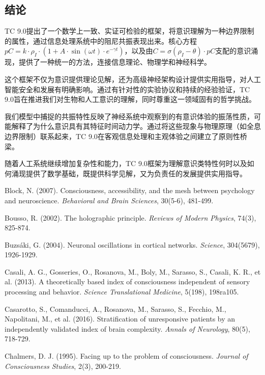\documentclass[12pt]{article}
\begin{document}
\begin{CJK}{UTF8}{gbsn}
\section{结论}
TC 9.0提出了一个数学上一致、实证可检验的框架，将意识理解为一种边界限制的属性，通过信息处理系统中的阻尼共振表现出来。核心方程$pC = k \cdot \rho_I \cdot (1 + A \cdot \sin(\omega t) \cdot e^{-\gamma t})$，以及由$C = \sigma(\rho_I - \theta) \cdot pC$支配的意识涌现，提供了一种统一的方法，连接信息理论、物理学和神经科学。

这个框架不仅为意识提供理论见解，还为高级神经架构设计提供实用指导，对人工智能安全和发展有明确影响。通过有针对性的实验协议和持续的经验验证，TC 9.0旨在推进我们对生物和人工意识的理解，同时尊重这一领域固有的哲学挑战。

我们模型中捕捉的共振特性反映了神经系统中观察到的有意识体验的振荡性质，可能解释了为什么意识具有其特征时间动力学。通过将这些现象与物理原理（如全息边界限制）联系起来，TC 9.0在客观信息处理和主观体验之间建立了原则性桥梁。

随着人工系统继续增加复杂性和能力，TC 9.0框架为理解意识类特性何时以及如何涌现提供了数学基础，既提供科学见解，又为负责任的发展提供实用指导。

\begin{thebibliography}{99}
     Block, N. (2007). Consciousness, accessibility, and the mesh between psychology and neuroscience. \emph{Behavioral and Brain Sciences}, 30(5-6), 481-499.
    
     Bousso, R. (2002). The holographic principle. \emph{Reviews of Modern Physics}, 74(3), 825-874.
    
     Buzsáki, G. (2004). Neuronal oscillations in cortical networks. \emph{Science}, 304(5679), 1926-1929.
    
     Casali, A. G., Gosseries, O., Rosanova, M., Boly, M., Sarasso, S., Casali, K. R., et al. (2013). A theoretically based index of consciousness independent of sensory processing and behavior. \emph{Science Translational Medicine}, 5(198), 198ra105.
    
     Casarotto, S., Comanducci, A., Rosanova, M., Sarasso, S., Fecchio, M., Napolitani, M., et al. (2016). Stratification of unresponsive patients by an independently validated index of brain complexity. \emph{Annals of Neurology}, 80(5), 718-729.
    
     Chalmers, D. J. (1995). Facing up to the problem of consciousness. \emph{Journal of Consciousness Studies}, 2(3), 200-219.
    

\end{thebibliography}
\end{CJK}
\end{document}
